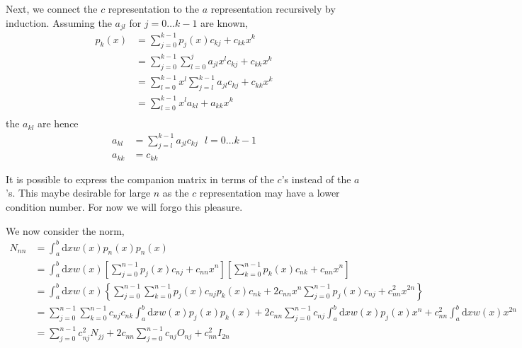 \documentclass[paper=a4, fontsize=11pt]{article} %
\numberwithin{equation}{section} %
\numberwithin{figure}{section} %
\numberwithin{table}{section} %
\newcommand{\rd}{{\mathrm{d}}}
\begin{document}
Next, we connect the $c$ representation to the $a$ representation recursively by induction.
Assuming the $a_{jl}$ for $j = 0 \ldots k-1$ are known,   
\begin{equation}
\begin{split}
p_k(x) &= \sum_{j=0}^{k-1} p_{j}(x) c_{kj} + c_{kk} x^k \\
&= \sum_{j=0}^{k-1} \sum_{l=0}^j a_{jl} x^l c_{kj} + c_{kk} x^k \\
&= \sum_{l=0}^{k-1} x^l \sum_{j=l}^{k-1} a_{jl} c_{kj} + c_{kk} x^k \\
&= \sum_{l=0}^{k-1} x^l a_{kl} + a_{kk} x^k \\
\end{split}
\end{equation}
the $a_{kl}$ are hence
\begin{equation}
\begin{split}
a_{kl} &= \sum_{j=l}^{k-1} a_{jl} c_{kj} \ \ \ l=0 \ldots k-1 \\
a_{kk} &= c_{kk}
\end{split}
\end{equation}

It is possible to express the companion matrix in terms of the $c$'s instead of the $a$'s. This maybe desirable for large $n$ as the $c$ representation may have a lower condition number. For now we will forgo this pleasure.

We now consider the norm,
\begin{equation}
\begin{split}
N_{nn} &= \int_a^b \rd x w(x) p_n(x) p_n(x) \\
&= \int_a^b \rd x w(x) \left[\sum_{j=0}^{n-1} p_{j}(x) c_{nj} + c_{nn} x^n\right] \left[\sum_{k=0}^{n-1} p_{k}(x) c_{nk} + c_{nn} x^n\right] \\
&= \int_a^b \rd x w(x) \left\{\sum_{j=0}^{n-1} \sum_{k=0}^{n-1} p_{j}(x) c_{nj}p_{k}(x) c_{nk} + 2c_{nn} x^n \sum_{j=0}^{n-1} p_{j}(x) c_{nj} + c_{nn}^2 x^{2n}\right\} \\
&= \sum_{j=0}^{n-1} \sum_{k=0}^{n-1} c_{nj}c_{nk}\int_a^b \rd x w(x) p_{j}(x)p_{k}(x) + 2c_{nn}  \sum_{j=0}^{n-1} c_{nj} \int_a^b \rd x w(x) p_{j}(x)x^n + c_{nn}^2 \int_a^b \rd x w(x) x^{2n} \\
&= \sum_{j=0}^{n-1} c_{nj}^2 N_{jj} + 2c_{nn}  \sum_{j=0}^{n-1} c_{nj} O_{nj} + c_{nn}^2 I_{2n}
\end{split}
\end{equation}
\end{document}
